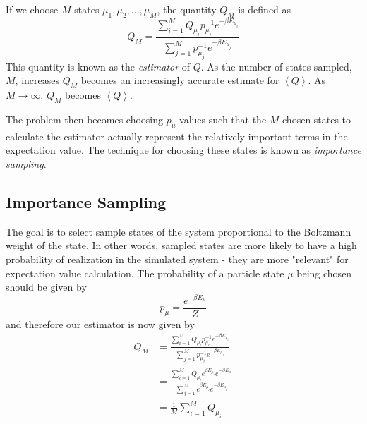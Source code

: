 \documentclass{article}
\begin{document}
If we choose $M$ states ${\mu_{1}, \mu_{2}, ..., \mu_{M}}$, the quantity
$Q_{M}$ is defined as
$$Q_{M} = \frac{\sum_{i=1}^{M}Q_{\mu_{i}}p_{\mu_{i}}^{-1}e^{-\beta E_{\mu_{i}}}}{\sum_{j=1}^{M}p_{\mu_{j}}^{-1}e^{-\beta E_{\mu_{j}}}}$$
This quantity is known as the \emph{estimator} of $Q$. As the number of states sampled, $M$, increases $Q_{M}$ becomes an
increasingly accurate estimate for $\left \langle Q \right \rangle$. As $M \rightarrow \infty$, $Q_{M}$ becomes $\left \langle Q \right \rangle$.

The problem then becomes choosing $p_{\mu}$ values such that the $M$ chosen states to calculate the
estimator actually represent the relatively important terms in the expectation value. The technique for
choosing these states is known as \emph{importance sampling}.

\subsection{Importance Sampling}
The goal is to select sample states of the system proportional to the Boltzmann weight of the state.
In other words, sampled states are more likely to have a high probability of realization in the
simulated system - they are more "relevant" for expectation value calculation. The probability of a
particle state $\mu$ being chosen should be given by
$$
p_{\mu} = \frac{e^{-\beta E_{\mu}}}{Z}
$$
and therefore our estimator is now given by
$$
\begin{aligned}
Q_{M} &= \frac{\sum_{i=1}^{M}Q_{\mu_{i}}p_{\mu_{i}}^{-1}e^{-\beta E_{\mu_{i}}}}{\sum_{j=1}^{M}p_{\mu_{j}}^{-1}e^{-\beta E_{\mu_{j}}}} \\
&= \frac{\sum_{i=1}^{M}Q_{\mu_{i}}e^{\beta E_{\mu_{i}}}e^{-\beta E_{\mu_{i}}}}{\sum_{j=1}^{M}e^{\beta E_{\mu_{j}}}e^{-\beta E_{\mu_{j}}}}\\
&= \frac{1}{M}\sum_{i=1}^{M}Q_{\mu_{i}}
\end{aligned}
$$
\end{document}
